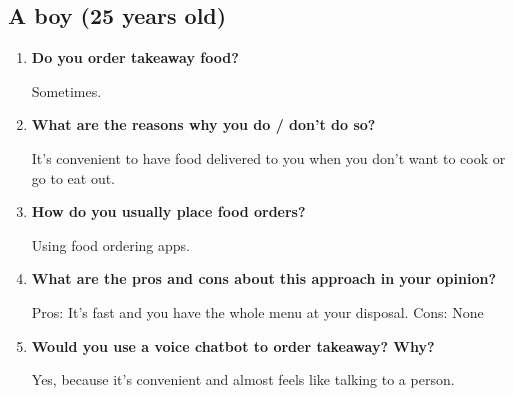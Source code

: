 \subsection*{A boy (25 years old)}

\begin{enumerate}

\item \textbf{Do you order takeaway food?}

Sometimes.

\item \textbf{What are the reasons why you do / don't do so?}

It's convenient to have food delivered to you when you don't want to cook or go to eat out.

\item \textbf{How do you usually place food orders?}

Using food ordering apps.

\item \textbf{What are the pros and cons about this approach in your opinion?}

Pros: It's fast and you have the whole menu at your disposal.
Cons: None

\item \textbf{Would you use a voice chatbot to order takeaway? Why?}

Yes, because it's convenient and almost feels like talking to a person.

\end{enumerate}